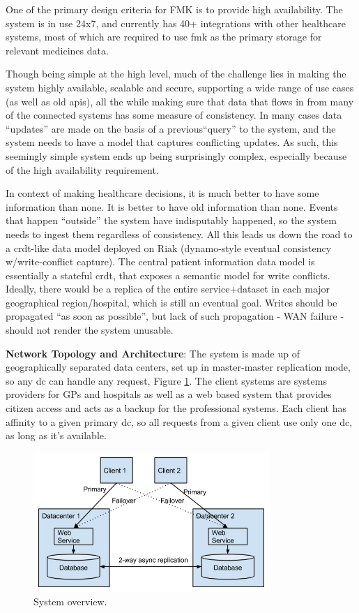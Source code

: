 \documentclass[11pt,a4paper]{report}
\begin{document}
One of the primary design criteria for FMK is to provide high availability. The system is in use 24x7, and currently has 40+ integrations with other healthcare systems, most of which are required to use \gls{fmk} as the primary storage for relevant medicines data.

Though being simple at the high level, much of the challenge lies in making the system highly available, scalable and secure, supporting a wide range of use cases (as well as old \glspl{api}), all the while making sure that data that flows in from many of the connected systems has some measure of consistency. In many cases data ``updates'' are made on the basis of a previous``query'' to the system, and the system needs to have a model that captures conflicting updates. As such, this seemingly simple system ends up being surprisingly complex, especially because of the high availability requirement.

In context of making healthcare decisions, it is much better to have some information than none. It is better to have old information than none. Events that happen ``outside'' the system have indisputably happened, so the system needs to ingest them regardless of consistency.
All this leads us down the road to a \gls{crdt}-like data model deployed on Riak (dynamo-style eventual consistency w/write-conflict capture). The central patient information data model is essentially a stateful \gls{crdt}, that exposes a semantic model for write conflicts. Ideally, there would be a replica of the entire service+dataset in each major geographical region/hospital, which is still an eventual goal. Writes should be propagated ``as soon as possible'', but lack of such propagation - WAN failure - should not render the system unusable.

{\bf Network Topology and Architecture}: 
The system is made up of geographically separated data centers, set up in master-master replication mode, so any \gls{dc} can handle any request, Figure \ref{fig:system_overview}.
The client systems are systems providers for GPs and hospitals as well as a web based system that provides citizen access and acts as a backup for the professional systems.
Each client has affinity to a given primary \gls{dc}, so all requests from a given client use only one \gls{dc}, as long as it's available.
\begin{figure}[!h]
	\centering
	\includegraphics[width=0.8\textwidth]{./img/image3.png}

	\caption{System overview.}
	\label{fig:system_overview}
\end{figure}
\end{document}
